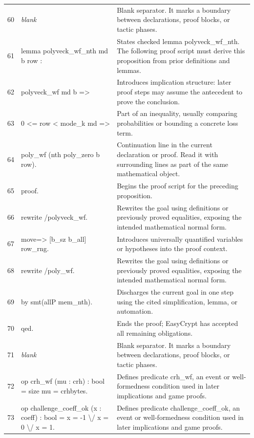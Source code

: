 \documentclass[10pt]{article}
\begin{document}
\begin{longtable}{r L{0.53\textwidth} L{0.37\textwidth}}
60 & {\ttfamily\scriptsize \emph{blank}} & Blank separator.  It marks a boundary between declarations, proof blocks, or tactic phases. \\
61 & {\ttfamily\scriptsize lemma polyveck\_wf\_nth md b row :} & States checked lemma polyveck\_wf\_nth.  The following proof script must derive this proposition from prior definitions and lemmas. \\
62 & {\ttfamily\scriptsize   polyveck\_wf md b =>} & Introduces implication structure: later proof steps may assume the antecedent to prove the conclusion. \\
63 & {\ttfamily\scriptsize   0 <= row < mode\_k md =>} & Part of an inequality, usually comparing probabilities or bounding a concrete loss term. \\
64 & {\ttfamily\scriptsize   poly\_wf (nth poly\_zero b row).} & Continuation line in the current declaration or proof.  Read it with surrounding lines as part of the same mathematical object. \\
65 & {\ttfamily\scriptsize proof.} & Begins the proof script for the preceding proposition. \\
66 & {\ttfamily\scriptsize rewrite /polyveck\_wf.} & Rewrites the goal using definitions or previously proved equalities, exposing the intended mathematical normal form. \\
67 & {\ttfamily\scriptsize move=> [b\_sz b\_all] row\_rng.} & Introduces universally quantified variables or hypotheses into the proof context. \\
68 & {\ttfamily\scriptsize rewrite /poly\_wf.} & Rewrites the goal using definitions or previously proved equalities, exposing the intended mathematical normal form. \\
69 & {\ttfamily\scriptsize by smt(allP mem\_nth).} & Discharges the current goal in one step using the cited simplification, lemma, or automation. \\
70 & {\ttfamily\scriptsize qed.} & Ends the proof; EasyCrypt has accepted all remaining obligations. \\
71 & {\ttfamily\scriptsize \emph{blank}} & Blank separator.  It marks a boundary between declarations, proof blocks, or tactic phases. \\
72 & {\ttfamily\scriptsize op crh\_wf (mu : crh) : bool = size mu = crhbytes.} & Defines predicate crh\_wf, an event or well-formedness condition used in later implications and game proofs. \\
73 & {\ttfamily\scriptsize op challenge\_coeff\_ok (x : coeff) : bool = x = -1 \textbackslash{}/ x = 0 \textbackslash{}/ x = 1.} & Defines predicate challenge\_coeff\_ok, an event or well-formedness condition used in later implications and game proofs. \\

\end{longtable}
\end{document}
